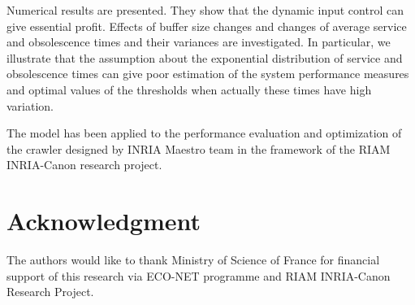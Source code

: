 \documentclass[11pt]{article}
\begin{document}
Numerical results are presented. They show that the dynamic input
control can give essential profit. Effects of buffer size changes
and changes of average service and obsolescence times and their
variances are investigated. In particular, we illustrate that the
assumption about the exponential distribution of service and
obsolescence times can give poor estimation of the system performance 
measures and optimal values of the thresholds when actually these times 
have high variation.

The model has been applied to the performance evaluation and
optimization of the crawler designed by INRIA Maestro team in the framework
of the RIAM INRIA-Canon research project.


\section*{Acknowledgment}
The authors would like to thank Ministry of Science of France for
financial support of this research via ECO-NET programme and RIAM
INRIA-Canon Research Project.
\end{document}

